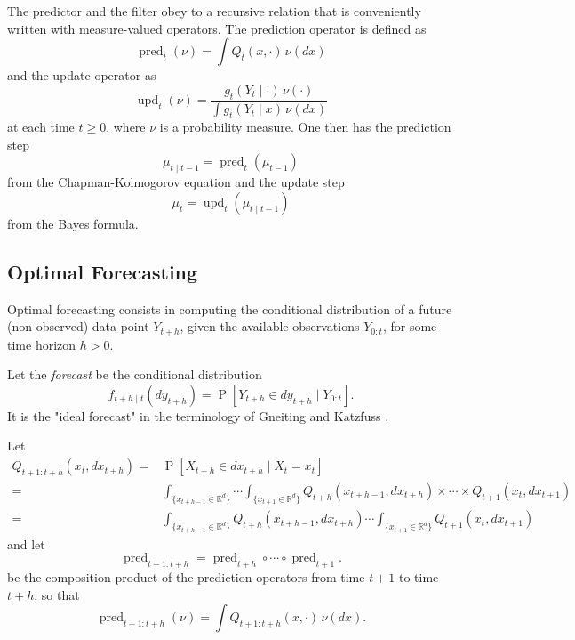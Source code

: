 \documentclass{article}
\newcommand{\R}{\mathbb R}
\DeclareMathOperator{\prob}{P}
\DeclareMathOperator{\pred}{pred}
\DeclareMathOperator{\upd}{upd}
\begin{document}
The predictor and the filter obey to a recursive relation that is conveniently written with measure-valued operators. The prediction operator is defined as
\begin{equation}
\label{eq:pred-operator}
    \pred_t(\nu) = \int Q_t(x,\cdot) \, \nu(dx)
\end{equation}
and the update operator as
\begin{equation}
\label{eq:upd-operator}
    \upd_t(\nu) = \frac{g_t(Y_t \mid \cdot) \, \nu(\cdot)}{\int g_t(Y_t \mid x) \, \nu(dx)}
\end{equation}
at each time $t \geq 0$, where $\nu$ is a probability measure. One then has the prediction step
\begin{equation*}
    \mu_{t \mid t-1} = \pred_t(\mu_{t-1})  
\end{equation*}
from the Chapman-Kolmogorov equation and the update step
\begin{equation*}
    \mu_t = \upd_t(\mu_{t \mid t-1})
\end{equation*}
from the Bayes formula.

\subsection{Optimal Forecasting}

Optimal forecasting consists in computing the conditional distribution of a future (non observed) data point $Y_{t+h}$, given the available observations $Y_{0:t}$, for some time horizon $h>0$.

Let the \textit{forecast} be the conditional distribution
\begin{equation*}
    f_{t+h \mid t}(dy_{t+h}) = \prob[Y_{t+h} \in dy_{t+h} \mid Y_{0:t}].
\end{equation*}
It is the "ideal forecast" in the terminology of Gneiting and Katzfuss \cite{Gneiting2014}.

Let
\begin{align*}
    Q_{t+1:t+h}(x_t,dx_{t+h}) =& \prob [X_{t+h} \in dx_{t+h} \mid X_t=x_t] \\
    =& \int_{\{x_{t+h-1}  \in \R^d\}} \cdots \int_{\{x_{t+1} \in \R^d\}} Q_{t+h}(x_{t+h-1},dx_{t+h}) \times \cdots \times Q_{t+1}(x_t,dx_{t+1}) \\
    =& \int_{\{x_{t+h-1} \in \R^d\}} Q_{t+h}(x_{t+h-1},dx_{t+h}) \cdots \int_{\{x_{t+1} \in \R^d\}} Q_{t+1}(x_t,dx_{t+1})
\end{align*}
and let
\begin{equation*}
    \pred_{t+1:t+h} = \pred_{t+h} \circ \cdots \circ \pred_{t+1}.
\end{equation*}
be the composition product of the prediction operators from time $t+1$ to time $t+h$, so that
\begin{equation}
\label{eq:compo-pred}
    \pred_{t+1:t+h}(\nu) = \int Q_{t+1:t+h}(x,\cdot) \, \nu(dx). 
\end{equation}
\end{document}
